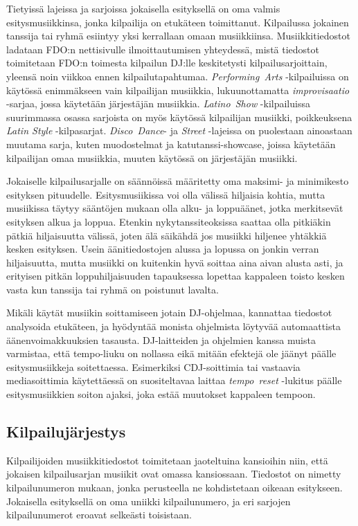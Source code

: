 \documentclass[12pt, a4paper, oneside]{article}
\begin{document}
Tietyissä lajeissa ja sarjoissa jokaisella esityksellä on oma valmis esitysmusiikkinsa,
jonka kilpailija on etukäteen toimittanut.
Kilpailussa jokainen tanssija tai ryhmä esiintyy yksi kerrallaan omaan musiikkiinsa.
Musiikkitiedostot ladataan FDO:n nettisivulle ilmoittautumisen yhteydessä,
mistä tiedostot toimitetaan FDO:n toimesta kilpailun DJ:lle keskitetysti kilpailusarjoittain,
yleensä noin viikkoa ennen kilpailutapahtumaa.
\textit{Performing~Arts} -kilpailuissa on käytössä enimmäkseen vain kilpailijan musiikkia,
lukuunottamatta \textit{improvisaatio} -sarjaa, jossa käytetään järjestäjän musiikkia.
\textit{Latino~Show} -kilpailuissa suurimmassa osassa sarjoista on myös käytössä kilpailijan musiikki,
poikkeuksena \textit{Latin Style} -kilpasarjat.
\textit{Disco~Dance}- ja \textit{Street} -lajeissa on puolestaan ainoastaan muutama sarja,
kuten muodostelmat ja katutanssi-showcase,
joissa käytetään kilpailijan omaa musiikkia,
muuten käytössä on järjestäjän musiikki.

Jokaiselle kilpailusarjalle on säännöissä määritetty oma maksimi- ja minimikesto esityksen pituudelle.
Esitysmusiikissa voi olla välissä hiljaisia kohtia,
mutta musiikissa täytyy sääntöjen mukaan olla alku- ja loppuäänet,
jotka merkitsevät esityksen alkua ja loppua.
Etenkin nykytanssiteoksissa saattaa olla pitkiäkin pätkiä hiljaisuutta välissä,
joten älä säikähdä jos musiikki hiljenee yhtäkkiä kesken esityksen.
Usein äänitiedostojen alussa ja lopussa on jonkin verran hiljaisuutta,
mutta musiikki on kuitenkin hyvä soittaa aina aivan alusta asti,
ja erityisen pitkän loppuhiljaisuuden tapauksessa lopettaa kappaleen toisto kesken vasta kun tanssija tai ryhmä on poistunut lavalta.

Mikäli käytät musiikin soittamiseen jotain DJ-ohjelmaa,
kannattaa tiedostot analysoida etukäteen,
ja hyödyntää monista ohjelmista löytyvää automaattista äänenvoimakkuuksien tasausta.
DJ-laitteiden ja ohjelmien kanssa muista varmistaa,
että tempo-liuku on nollassa eikä mitään efektejä ole jäänyt päälle esitysmusiikkeja soitettaessa.
Esimerkiksi CDJ-soittimia tai vastaavia mediasoittimia käytettäessä on suositeltavaa laittaa \textit{tempo~reset} -lukitus päälle esitysmusiikkien soiton ajaksi,
joka estää muutokset kappaleen tempoon.

\subsection{Kilpailujärjestys} \label{subsec:kilpailujarjestys}

Kilpailijoiden musiikkitiedostot toimitetaan jaoteltuina kansioihin niin,
että jokaisen kilpailusarjan musiikit ovat omassa kansiossaan.
Tiedostot on nimetty kilpailunumeron mukaan,
jonka perusteella ne kohdistetaan oikeaan esitykseen.
Jokaisella esityksellä on oma uniikki kilpailunumero,
ja eri sarjojen kilpailunumerot eroavat selkeästi toisistaan.
\end{document}
